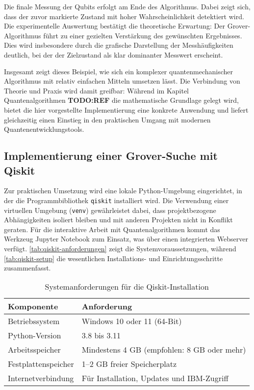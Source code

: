 Die finale Messung der Qubits erfolgt am Ende des Algorithmus. Dabei zeigt sich, dass der zuvor markierte Zustand mit hoher Wahrscheinlichkeit detektiert wird. Die experimentelle Auswertung bestätigt die theoretische Erwartung: Der Grover-Algorithmus führt zu einer gezielten Verstärkung des gewünschten Ergebnisses. Dies wird insbesondere durch die grafische Darstellung der Messhäufigkeiten deutlich, bei der der Zielzustand als klar dominanter Messwert erscheint.

Insgesamt zeigt dieses Beispiel, wie sich ein komplexer quantenmechanischer Algorithmus mit relativ einfachen Mitteln umsetzen lässt. Die Verbindung von Theorie und Praxis wird damit greifbar: Während im Kapitel Quantenalgorithmen \textbf{TODO:REF} die mathematische Grundlage gelegt wird, bietet die hier vorgestellte Implementierung eine konkrete Anwendung und liefert gleichzeitig einen Einstieg in den praktischen Umgang mit modernen Quantenentwicklungstools.

\subsection{Implementierung einer Grover-Suche mit Qiskit}
\label{sec:grover-implementation}

Zur praktischen Umsetzung wird eine lokale Python-Umgebung eingerichtet, in der die Programmbibliothek \texttt{qiskit} installiert wird. Die Verwendung einer virtuellen Umgebung (\texttt{venv}) gewährleistet dabei, dass projektbezogene Abhängigkeiten isoliert bleiben und mit anderen Projekten nicht in Konflikt geraten. Für die interaktive Arbeit mit Quantenalgorithmen kommt das Werkzeug Jupyter Notebook zum Einsatz, was über einen integrierten Webserver verfügt. \autoref{tab:qiskit-anforderungen} zeigt die Systemvoraussetzungen, während \autoref{tab:qiskit-setup} die wesentlichen Installations- und Einrichtungsschritte zusammenfasst.

\begin{table}[ht!]
\centering
\begin{tabularx}{\textwidth}{|l|X|}
\hline
\textbf{Komponente} & \textbf{Anforderung} \\
\hline
Betriebssystem & Windows 10 oder 11 (64-Bit) \\
\hline
Python-Version & 3.8 bis 3.11 \\
\hline
Arbeitsspeicher & Mindestens 4 GB (empfohlen: 8 GB oder mehr) \\
\hline
Festplattenspeicher & 1–2 GB freier Speicherplatz \\
\hline
Internetverbindung & Für Installation, Updates und IBM-Zugriff \\
\hline
\end{tabularx}
\caption{Systemanforderungen für die Qiskit-Installation}
\label{tab:qiskit-anforderungen}
\end{table}


